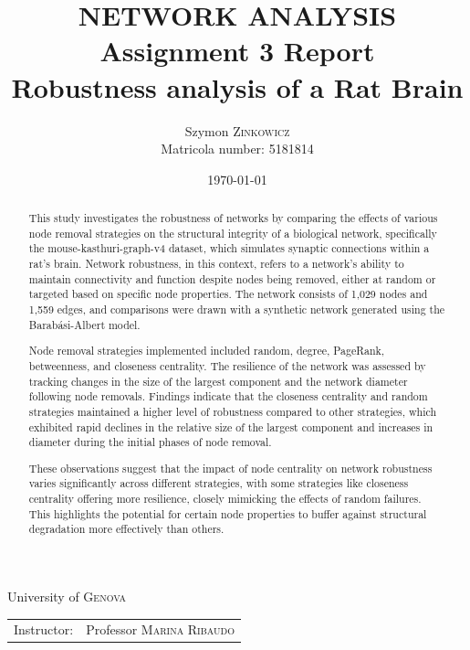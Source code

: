 \documentclass[
	report, %
	11pt, %
]{CSUniSchoolLabReport}
\newcounter{ct}
\begin{document}
\title{NETWORK ANALYSIS \\
\large Assignment 3 Report \\
		Robustness analysis of a Rat Brain} %
\author{Szymon \textsc{Zinkowicz} \\ Matricola number: 5181814} %
\date{\today} %

\maketitle %
\thispagestyle{empty}

\begin{center}
	\vspace{\fill}
	University of \textsc{Genova} \\
	\begin{tabular}{l r}
		Instructor: & Professor \textsc{Marina Ribaudo}
	\end{tabular}
\end{center}
\pagebreak



\begin{abstract}
	\thispagestyle{empty}This study investigates the robustness of networks by comparing the effects of various node removal strategies on the structural integrity of a biological network, specifically the mouse-kasthuri-graph-v4 dataset, which simulates synaptic connections within a rat's brain. Network robustness, in this context, refers to a network's ability to maintain connectivity and function despite nodes being removed, either at random or targeted based on specific node properties. The network consists of 1,029 nodes and 1,559 edges, and comparisons were drawn with a synthetic network generated using the Barabási-Albert model.\par
	Node removal strategies implemented included random, degree, PageRank, betweenness, and closeness centrality. The resilience of the network was assessed by tracking changes in the size of the largest component and the network diameter following node removals. Findings indicate that the closeness centrality and random strategies maintained a higher level of robustness compared to other strategies, which exhibited rapid declines in the relative size of the largest component and increases in diameter during the initial phases of node removal.\par
	These observations suggest that the impact of node centrality on network robustness varies significantly across different strategies, with some strategies like closeness centrality offering more resilience, closely mimicking the effects of random failures. This highlights the potential for certain node properties to buffer against structural degradation more effectively than others.
\end{abstract}
\pagebreak
\end{document}
